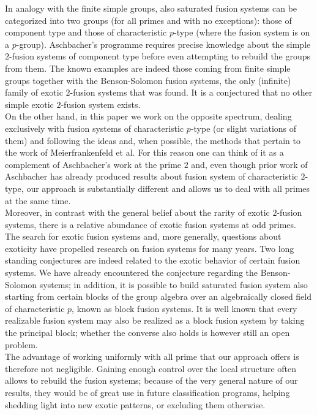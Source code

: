\documentclass{amsart}
\numberwithin{equation}{section}
\theoremstyle{definition}
\theoremstyle{subresult}
\theoremstyle{caseresult}
\newcommand{\<}{\langle}
\renewcommand{\>}{\rangle}
\begin{document}
In analogy with the finite simple groups, also saturated fusion systems can be categorized into two groups (for all primes and with no exceptions): those of component type and those of characteristic $p$-type (where the fusion system is on a $p$-group). Aschbacher's programme requires precise knowledge about the simple $2$-fusion systems of component type before even attempting to rebuild the groups from them. The known examples are indeed those coming from finite simple groups together with the Benson-Solomon fusion systems, the only (infinite) family of exotic $2$-fusion systems that was found. It is a conjectured that no other simple exotic $2$-fusion system exists.\\
On the other hand, in this paper we work on the opposite spectrum, dealing exclusively with fusion systems of characteristic $p$-type (or slight variations of them) and following the ideas and, when possible, the methods that pertain to the work of Meierfrankenfeld et al. For this reason one can think of it as a complement of Aschbacher's work at the prime $2$ and, even though prior work of Aschbacher has already produced results about fusion system of characteristic $2$-type, our approach is substantially different and allows us to deal with all primes at the same time.\\

Moreover, in contrast with the general belief about the rarity of exotic $2$-fusion systems, there is a relative abundance of exotic fusion systems at odd primes. The search for exotic fusion systems and, more generally, questions about exoticity have propelled research on fusion systems for many years. Two long standing conjectures are indeed related to the exotic behavior of certain fusion systems. We have already encountered the conjecture regarding the Benson-Solomon systems; in addition, it is possible to build saturated fusion system also starting from certain blocks of the group algebra over an algebraically closed field of characteristic $p$, known as block fusion systems. It is well known that every realizable fusion system may also be realized as a block fusion system by taking the principal block; whether the converse also holds is however still an open problem.\\
The advantage of working uniformly with all prime that our approach offers is therefore not negligible. Gaining enough control over the local structure often allows to rebuild the fusion systems; because of the very general nature of our results, they would be of great use in future classification programs, helping shedding light into new exotic patterns, or excluding them otherwise.\\
\end{document}
